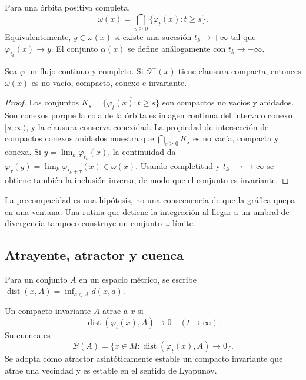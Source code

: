 \begin{definition}
Para una órbita positiva completa,
\begin{equation}
 \omega(x)=
 \bigcap_{s\ge0}\overline{\{\varphi_t(x):t\ge s\}}.
 \label{geo:eq:omega-limit}
\end{equation}
Equivalentemente, \(y\in\omega(x)\) si existe una sucesión
\(t_k\to+\infty\) tal que \(\varphi_{t_k}(x)\to y\). El conjunto
\(\alpha(x)\) se define análogamente con \(t_k\to-\infty\).
\end{definition}

\begin{proposition}
Sea \(\varphi\) un flujo continuo y completo. Si
\(\mathcal O^+(x)\) tiene clausura compacta, entonces \(\omega(x)\) es no
vacío, compacto, conexo e invariante.
\end{proposition}

\begin{proof}
Los conjuntos
\(K_s=\overline{\{\varphi_t(x):t\ge s\}}\) son compactos no vacíos y
anidados. Son conexos porque la cola de la órbita es imagen continua del
intervalo conexo \([s,\infty)\), y la clausura conserva conexidad.
La propiedad de intersección de compactos conexos anidados muestra que
\(\bigcap_{s\ge0}K_s\) es no vacía, compacta y conexa. Si
\(y=\lim_k\varphi_{t_k}(x)\), la continuidad da
\(\varphi_\tau(y)=\lim_k\varphi_{t_k+\tau}(x)\in\omega(x)\). Usando
completitud y \(t_k-\tau\to\infty\) se obtiene también la inclusión inversa,
de modo que el conjunto es invariante.
\end{proof}

La precompacidad es una hipótesis, no una consecuencia de que la gráfica
quepa en una ventana. Una rutina que detiene la integración al llegar a un
umbral de divergencia tampoco construye un conjunto \(\omega\)-límite.

\subsection{Atrayente, atractor y cuenca}

Para un conjunto \(A\) en un espacio métrico, se escribe
\(\operatorname{dist}(x,A)=\inf_{a\in A}d(x,a)\).

\begin{definition}
Un compacto invariante \(A\) atrae a \(x\) si
\begin{equation}
 \operatorname{dist}(\varphi_t(x),A)\longrightarrow0
 \quad(t\to\infty).
 \label{geo:eq:attraction}
\end{equation}
Su cuenca es
\begin{equation}
 \mathcal B(A)=\{x\in M:
 \operatorname{dist}(\varphi_t(x),A)\to0\}.
 \label{geo:eq:basin}
\end{equation}
Se adopta como atractor asintóticamente estable un compacto invariante
que atrae una vecindad y es estable en el sentido de Lyapunov.
\end{definition}

